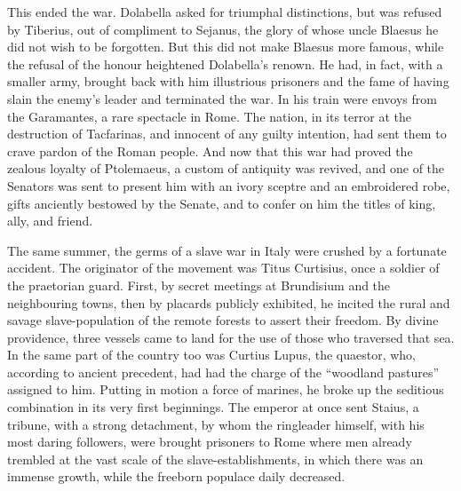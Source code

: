 This ended the war. Dolabella asked for triumphal distinctions, but was refused by Tiberius, out of compliment to Sejanus, the glory of whose uncle Blaesus he did not wish to be forgotten. But this did not make Blaesus more famous, while the refusal of the honour heightened Dolabella's renown. He had, in fact, with a smaller army, brought back with him illustrious prisoners and the fame of having slain the enemy's leader and terminated the war. In his train were envoys from the Garamantes, a rare spectacle in Rome. The nation, in its terror at the destruction of Tacfarinas, and innocent of any guilty intention, had sent them to crave pardon of the Roman people. And now that this war had proved the zealous loyalty of Ptolemaeus, a custom of antiquity was revived, and one of the Senators was sent to present him with an ivory sceptre and an embroidered robe, gifts anciently bestowed by the Senate, and to confer on him the titles of king, ally, and friend.


The same summer, the germs of a slave war in Italy were crushed by a fortunate accident. The originator of the movement was Titus Curtisius, once a soldier of the praetorian guard. First, by secret meetings at Brundisium and the neighbouring towns, then by placards publicly exhibited, he incited the rural and savage slave-population of the remote forests to assert their freedom. By divine providence, three vessels came to land for the use of those who traversed that sea. In the same part of the country too was Curtius Lupus, the quaestor, who, according to ancient precedent, had had the charge of the ``woodland pastures'' assigned to him. Putting in motion a force of marines, he broke up the seditious combination in its very first beginnings. The emperor at once sent Staius, a tribune, with a strong detachment, by whom the ringleader himself, with his most daring followers, were brought prisoners to Rome where men already trembled at the vast scale of the slave-establishments, in which there was an immense growth, while the freeborn populace daily decreased.


